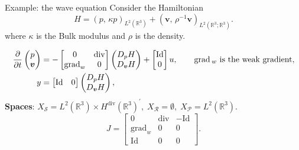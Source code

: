 \documentclass[aspectratio=169]{beamer}
\DeclareMathOperator*{\grad}{grad}
\renewcommand{\div}{\operatorname{div}}
\newcommand{\bbR}{\mathbb{R}}
\newcommand{\inpr}[3][]{\ensuremath{( #2, \, #3 )_{#1}}}
\begin{document}
\begin{frame}{Example: the wave equation}
	Consider the Hamiltonian
	\begin{equation*}
		{H} = \inpr[L^2(\bbR^3)]{p}{\kappa p} + \inpr[L^2(\bbR^3; \bbR^3)]{\bm{v}}{\rho^{-1}\bm{v}}.
	\end{equation*}
	where $\kappa$ is the Bulk modulus and $\rho$ is the density. \\
	\vspace{.3cm}
	\begin{tcolorbox}[nobeforeafter, colframe=theme,title=The wave equation on $\bbR^3$ with distributed input]%
	\begin{equation*}
		\begin{aligned}
			\diffp{}{t}
			\begin{pmatrix}
				p \\
				\bm{v} \\
			\end{pmatrix} &=-
			\begin{bmatrix}
				0 & \div \\
				\grad_w & 0
			\end{bmatrix}
			\begin{pmatrix}
				D_p{H} \\
				D_{\bm{v}}{H}\\
			\end{pmatrix} + \begin{bmatrix}
				\mathrm{Id} \\
				0
			\end{bmatrix} u, \qquad \grad{}_{w} \text{ is the weak gradient},\\
			y &= \begin{bmatrix}
				\mathrm{Id} & 0
			\end{bmatrix} \begin{pmatrix}
				D_p{H} \\
				D_{\bm{v}}{H}\\
			\end{pmatrix},
		\end{aligned}
	\end{equation*}
	\textbf{Spaces}: $X_{\mathcal{S}}= L^2(\bbR^3) \times H^{\div}(\bbR^3)^{'}, \; X_{\mathcal{R}} = \emptyset, \; X_{\mathcal{P}}= L^{2}(\bbR^3)$.
	\begin{equation*}
		J = \begin{bmatrix}
			0 & \div & - \mathrm{Id} \\
			\grad_w & 0 & 0 \\
			\mathrm{Id} & 0 & 0 
		\end{bmatrix}.
	\end{equation*}
	\end{tcolorbox} 
	


\end{frame}
\end{document}
